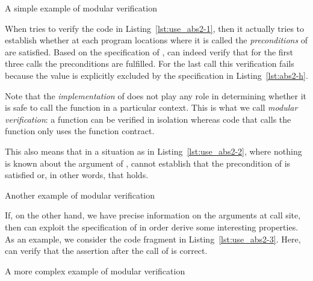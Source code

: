 \begin{listing}[hbt]
\begin{minipage}{\textwidth}

\end{minipage}
\caption{\label{lst:use_abs2-1} A simple example of modular verification}
\end{listing}

\FloatBarrier

When \framacwp tries to verify the code in Listing~\ref{lst:use_abs2-1},
then it actually tries to establish whether at each program locations where
it is called the \emph{preconditions} of  are satisfied.
Based on the specification of ,
\framacwp can indeed verify that for the first three calls the preconditions are fulfilled.
For the last call this verification fails because the value 
is explicitly excluded by the specification in Listing~\ref{lst:abs2-h}.

Note that the \emph{implementation} of 
does not play any role in determining whether it is safe to
call the function in a particular context.
This is what we call \emph{modular verification}: a function can be verified in
isolation whereas code that calls the function only uses the function contract.

This also means that in a situation as in Listing~\ref{lst:use_abs2-2},
where nothing is known about the argument of , 
\framacwp cannot establish that the precondition of  is satisfied
or, in other words, that  holds.

\begin{listing}[hbt]
\begin{minipage}{\textwidth}

\end{minipage}
\caption{\label{lst:use_abs2-2} Another example of modular verification}
\end{listing}

\clearpage

If, on the other hand, we have precise information on the arguments at call site, then \framacwp can exploit the specification of 
 in order derive some interesting properties.
As an example, we consider the code fragment in Listing~\ref{lst:use_abs2-3}.
Here, \framacwp can verify that the assertion after 
the call of  is correct.


\begin{listing}[hbt]
\begin{minipage}{\textwidth}

\end{minipage}
\caption{\label{lst:use_abs2-3} A more complex example of modular verification}
\end{listing}

